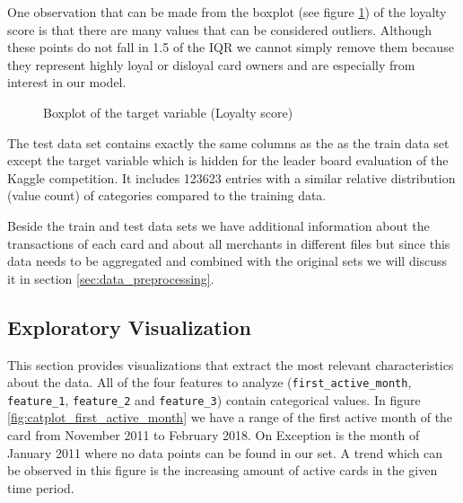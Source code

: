 \documentclass{article}
\begin{document}
One observation that can be made from the boxplot (see figure \ref{fig:boxplot_target}) of the loyalty score is that there are many values that can be considered outliers. Although these points do not fall in 1.5 of the IQR we cannot simply remove them because they represent highly loyal or disloyal card owners and are especially from interest in our model.
\newpage

\begin{figure}[h]
  \centering
  
  \caption{Boxplot of the target variable (Loyalty score)}
  \label{fig:boxplot_target}
\end{figure}

The test data set contains exactly the same columns as the as the train data set except the target variable which is hidden for the leader board evaluation of the Kaggle competition. It includes 123623 entries with a similar relative distribution (value count) of categories compared to the training data.

Beside the train and test data sets we have additional information about the transactions of each card and about all merchants in different files but since this data needs to be aggregated and combined with the original sets we will discuss it in section \ref{sec:data_preprocessing}. 

\subsection{Exploratory Visualization}


This section provides visualizations that extract the most relevant characteristics about the data. All of the four features to analyze (\texttt{first\_active\_month}, \texttt{feature\_1}, \texttt{feature\_2} and \texttt{feature\_3}) contain categorical values. In figure \ref{fig:catplot_first_active_month} we have a range of the first active month of the card from November 2011 to February 2018. On Exception is the month of January 2011 where no data points can be found in our set. A trend which can be observed in this figure is the increasing amount of active cards in the given time period.
\end{document}
